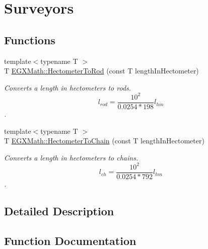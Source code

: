 \hypertarget{group___e_g_x_math-_conversions-_length_conversions-_s_i-_hectometer-_surveyors}{}\section{Surveyors}
\label{group___e_g_x_math-_conversions-_length_conversions-_s_i-_hectometer-_surveyors}
\subsection*{Functions}
\begin{DoxyCompactItemize}
\item 
{\footnotesize template$<$typename T $>$ }\\T \mbox{\hyperlink{group___e_g_x_math-_conversions-_length_conversions-_s_i-_hectometer-_surveyors_gafdf1df626e4b3c88f88bd3d6d3545e7d}{E\+G\+X\+Math\+::\+Hectometer\+To\+Rod}} (const T length\+In\+Hectometer)
\begin{DoxyCompactList}\small\item\em Converts a length in hectometers to rods. \[ l_{rod}= \frac{10^{2}}{0.0254 * 198} l_{hm} \]. \end{DoxyCompactList}\item 
{\footnotesize template$<$typename T $>$ }\\T \mbox{\hyperlink{group___e_g_x_math-_conversions-_length_conversions-_s_i-_hectometer-_surveyors_ga02973091150445cfe5798389ecccdceb}{E\+G\+X\+Math\+::\+Hectometer\+To\+Chain}} (const T length\+In\+Hectometer)
\begin{DoxyCompactList}\small\item\em Converts a length in hectometers to chains. \[ l_{ch}= \frac{10^{2}}{0.0254 * 792} l_{hm} \]. \end{DoxyCompactList}\end{DoxyCompactItemize}


\subsection{Detailed Description}


\subsection{Function Documentation}
\mbox{\label{group___e_g_x_math-_conversions-_length_conversions-_s_i-_hectometer-_surveyors_ga02973091150445cfe5798389ecccdceb}} 

